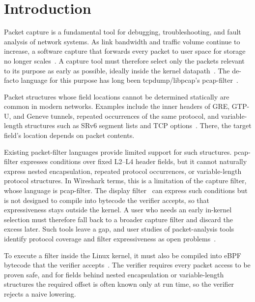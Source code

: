 \section{Introduction}
\label{sec:intro}

Packet capture is a fundamental tool for debugging, troubleshooting,
and fault analysis of network systems. As link bandwidth and traffic
volume continue to increase, a software capture that forwards every
packet to user space for storage no longer scales~\cite{braun2010capture}. A capture tool must therefore select only
the packets relevant to its purpose as early as possible, ideally
inside the kernel datapath~\cite{papadogiannakis2013scap}. The de-facto language for this purpose has
long been tcpdump/libpcap’s
pcap-filter~\cite{pcapfilter_man,mccanne1993bpf}.

Packet structures whose field locations cannot be determined
statically are common in modern networks. Examples include the inner
headers of GRE, GTP-U, and Geneve tunnels, repeated occurrences of the
same protocol, and variable-length structures such as SRv6 segment
lists and TCP options~\cite{rfc2784,gtp_3gpp,rfc8754,rfc8926,rfc9293}.
There, the target field's location depends on packet contents.

Existing packet-filter languages provide limited support for such
structures. pcap-filter expresses conditions over fixed L2--L4 header
fields, but it cannot naturally express nested encapsulation,
repeated protocol occurrences, or variable-length protocol structures.
In Wireshark terms, this is a limitation of the capture filter, whose
language is pcap-filter. The display filter~\cite{wireshark_dfref}
can express such conditions but is not designed to compile into
bytecode the verifier accepts, so that expressiveness stays outside
the kernel. A user who
needs an early in-kernel selection must therefore fall back to a
broader capture filter and discard the excess later. Such tools leave
a gap, and user studies of
packet-analysis tools identify protocol coverage and filter
expressiveness as open problems~\cite{sultana2024survey}.

To execute a filter inside
the Linux kernel, it must also be compiled into eBPF bytecode that the
verifier accepts~\cite{kernel_verifier,ebpf_loops,gershuni2019prevail}.
The verifier requires every packet access to be proven safe, and for
fields behind nested encapsulation or variable-length structures the
required offset is often known only at run time, so the verifier
rejects a naive lowering.

